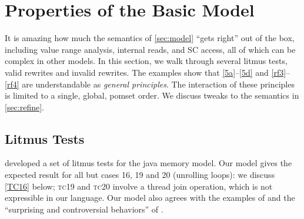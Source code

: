 \section{Properties of the Basic Model}
\label{sec:props}

It is amazing how much the semantics of \textsection\ref{sec:model} ``gets
right'' out of the box, including value range analysis, internal reads, and
SC access, all of which can be complex in other models.  In this section, we
walk through several litmus tests, valid rewrites and invalid rewrites.  The
examples show that \ref{5a}--\ref{5d} and \ref{rf3}--\ref{rf4} are
understandable as \emph{general principles}.  The interaction of these
principles is limited to a single, global, pomset order.  We discuss tweaks
to the semantics in \textsection\ref{sec:refine}.

\subsection{Litmus Tests}
\label{sec:litmus}




\citet{PughWebsite} developed a set of litmus tests for the java memory
model.  Our model gives the expected result for all but cases 16, 19 and 20
(unrolling loops): we discuss \ref{TC16} below; \textsc{tc19} and
\textsc{tc20} involve a thread join operation, which is not expressible in
our language.  Our model also agrees with the \oota{} examples of
\citet[]{DBLP:conf/esop/BattyMNPS15} and the ``surprising and
controversial behaviors'' of \citet[]{Manson:2005:JMM:1047659.1040336}.  %


